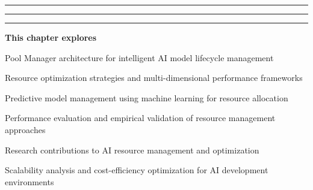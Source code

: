 \vspace{0.5cm}

\begin{center}
\textcolor{brandAccent}{
\rule{2cm}{0.8pt} \quad
\raisebox{-0.2ex}{\Large$\diamond$} \quad
\rule{4cm}{0.8pt} \quad
\raisebox{-0.2ex}{\Large$\diamond$} \quad
\rule{2cm}{0.8pt}
}
\end{center}

\vspace{2cm}

\begin{tcolorbox}[
    enhanced,
    colback=white,
    colframe=brandPrimary!40,
    boxrule=1pt,
    arc=12pt,
    drop shadow={brandPrimary!20},
    left=1.5cm,
    right=1.5cm,
    top=1.2cm,
    bottom=1.2cm,
    before upper={\parindent0pt}
]
\begin{center}
{\Large\textbf{\textcolor{brandPrimary}{This chapter explores}}}
\end{center}

\vspace{0.8cm}

\begin{compactlist}
    \item {\large Pool Manager architecture for intelligent AI model lifecycle management}
    \item {\large Resource optimization strategies and multi-dimensional performance frameworks}
    \item {\large Predictive model management using machine learning for resource allocation}
    \item {\large Performance evaluation and empirical validation of resource management approaches}
    \item {\large Research contributions to AI resource management and optimization}
    \item {\large Scalability analysis and cost-efficiency optimization for AI development environments}
\end{compactlist}
\end{tcolorbox}

\clearpage

